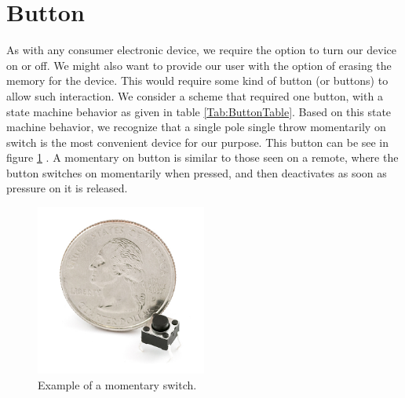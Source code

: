 \section{Button}
\label{Sec:Button}
As with any consumer electronic device, we require the option to turn our device on or off. We might also want to provide our user with the option of erasing the memory for the device. This would require some kind of button (or buttons) to allow such interaction. We consider a scheme that required one button, with a state machine behavior as given in table \ref{Tab:ButtonTable}. Based on this state machine behavior, we recognize that a single pole single throw momentarily on switch is the most convenient device for our purpose. This button can be see in figure \ref{Fig:MomButton} \cite{Web:SFEMOM}.
A momentary on button is similar to those seen on a remote, where the button switches on momentarily when pressed, and then deactivates as soon as pressure on it is released.
\begin{figure}
\begin{center}
\includegraphics[width=0.5\textwidth]{images/MOMButton.jpg}
\caption{Example of a momentary switch.}
\label{Fig:MomButton}
\end{center}
\end{figure}


